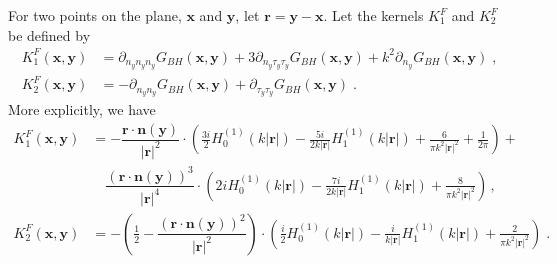 \documentclass[preprint,12pt]{article}
\def\br{{\boldsymbol r}}
\def\bn{{\boldsymbol n}}
\def\xx{{\boldsymbol x}}
\def\yy{{\boldsymbol y}}
\def\Gbh{{G_{BH}}}
\begin{document}
For two points on the plane, $\xx$ and $\yy$, let $\br = \yy - \xx$. Let the kernels $K_{1}^{F}$ and 
$K_{2}^{F}$ be defined by 
\begin{align}
  K_1^F(\xx,\yy) &= \partial_{n_{y}n_{y}n_{y}}\Gbh(\xx,\yy)
  + 3 \partial_{n_{y}\tau_{y}\tau_{y}}\Gbh(\xx,\yy) + k^{2} \partial_{n_{y}}\Gbh(\xx,\yy)\; , \label{eq:kf1} \\
  K_2^F(\xx,\yy) &= -\partial_{n_{y}n_{y}}\Gbh(\xx,\yy)
  + \partial_{\tau_{y}\tau_{y}}\Gbh(\xx,\yy) \label{eq:kf2} \; .
\end{align}
More explicitly, we have
\begin{align}
  K_1^F(\xx,\yy) &=  -\dfrac{\br \cdot \bn(\yy)}{|\br|^2}  \cdot \left( \frac{3 i}{2} H_0^{(1)}(k|\br|) - \frac{5 i}{2 k|\br|} H_1^{(1)}(k|\br|) + \frac{6}{\pi k^2 |\br|^2} + \frac{1}{2\pi}  \right) +     \\
  & \quad \dfrac{\left(\br \cdot \bn(\yy)\right)^3}{|\br|^4} \cdot \left( 2i H_0^{(1)}(k|\br|) - \frac{7 i}{2 k|\br|} H_1^{(1)}(k|\br|) + \frac{8}{\pi k^2 |\br|^2}  \right) \, , \nonumber \\
  K_2^F(\xx,\yy) &=  -\left(\frac{1}{2}-\dfrac{\left(\br \cdot \bn(\yy)\right)^2}{|\br|^2} \right)  \cdot \left( \frac{i}{2} H_0^{(1)}(k|\br|) - \frac{i}{k|\br|} H_1^{(1)}(k|\br|) + \frac{2}{\pi k^2 |\br|^2}  \right)\; .
\end{align}
\end{document}
